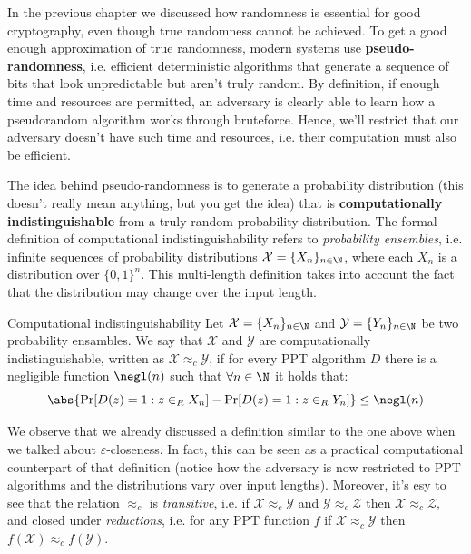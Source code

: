 \documentclass[a4paper, 12pt]{report}
\begin{document}
    In the previous chapter we discussed how randomness is essential for good cryptography, even though true randomness cannot be achieved. To get a good enough approximation of true randomness, modern systems use \textbf{pseudo-randomness}, i.e. efficient deterministic algorithms that generate a sequence of bits that look unpredictable but aren't truly random. By definition, if enough time and resources are permitted, an adversary is clearly able to learn how a pseudorandom algorithm works through bruteforce. Hence, we'll restrict that our adversary doesn't have such time and resources, i.e. their computation must also be efficient.
    
    The idea behind pseudo-randomness is to generate a  probability distribution (this doesn't really mean anything, but you get the idea) that is \textbf{computationally indistinguishable} from a truly random probability distribution. The formal definition of computational indistinguishability refers to \textit{probability ensembles}, i.e. infinite sequences of probability distributions $\mathcal{X} = \{X_n\}_{n \in \N}$, where each $X_n$ is a distribution over $\{0,1\}^n$. This multi-length definition takes into account the fact that the distribution may change over the input length.

    \begin{frameddefn}{Computational indistinguishability}
        Let  $\mathcal{X} = \{X_n\}_{n \in \N}$ and  $\mathcal{Y} = \{Y_n\}_{n \in \N}$ be two probability ensambles. We say that $\mathcal{X}$ and $\mathcal{Y}$ are computationally indistinguishable, written as $\mathcal{X} \approx_c \mathcal{Y}$, if for every PPT algorithm $D$ there is a negligible function $\negl(n)$ such that $\forall n \in \N$ it holds that:
        \[\abs{\Pr[D(z) = 1 : z \in_R X_n] - \Pr[D(z) = 1 : z \in_R Y_n]} \leq \negl(n)\]
    \end{frameddefn}

    We observe that we already discussed a definition similar to the one above when we talked about $\varepsilon$-closeness. In fact, this can be seen as a practical computational counterpart of that definition (notice how the adversary is now restricted to PPT algorithms and the distributions vary over input lengths). Moreover, it's esy to see that the relation $\approx_c$ is \textit{transitive}, i.e. if $\mathcal{X} \approx_c \mathcal{Y}$ and $\mathcal{Y} \approx_c \mathcal{Z}$ then $\mathcal{X} \approx_c \mathcal{Z}$, and closed under \textit{reductions}, i.e. for any PPT function $f$ if $\mathcal{X} \approx_c \mathcal{Y}$ then $f(\mathcal{X}) \approx_c f(\mathcal{Y})$.
\end{document}
